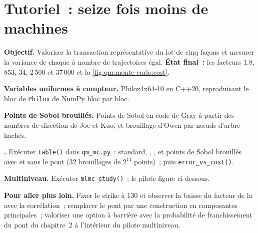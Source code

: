 \section{Tutoriel~: seize fois moins de machines}\label{tut:qm:monte-carlo:asian}

\begin{tutorial}
\textbf{Objectif.} Valoriser la transaction représentative du lot de cinq façons et mesurer la variance de chaque  à nombre de trajectoires égal. \textbf{État final~:} les facteurs 1.8, 853, 34, 2\,500 et 37\,000 et
la \cref{fig:qm:monte-carlo:cost}.
\begin{tutsteps}
\item \textbf{Variables uniformes à compteur.} Philox4x64-10 en C++20, reproduisant le bloc de \texttt{Philox} de NumPy bloc par bloc.
\label{lst:qm:monte-carlo:philox}
\item \textbf{Points de Sobol brouillés.} Points de Sobol en code de Gray à partir des nombres de direction de Joe et Kuo, et brouillage d'Owen par nœuds d'arbre hachés.
\label{lst:qm:monte-carlo:sobol}
\item \textbf{.} Exécuter \texttt{table()} dans \texttt{qm\_mc.py}~:  standard, , , et points de Sobol brouillés avec et sans le pont (32 brouillages de $2^{14}$ points)~; puis
\texttt{error\_vs\_cost()}.
\item \textbf{Multiniveau.} Exécuter \texttt{mlmc\_study()}~; le pilote figure ci-dessous.
\label{lst:qm:monte-carlo:mlmc}
\end{tutsteps}
\textbf{Pour aller plus loin.} Fixer le strike à 130 et observer la baisse du facteur de la  avec la corrélation~; remplacer le pont par une construction en composantes principales~; valoriser une option à barrière avec
la probabilité de franchissement du pont du chapitre~2 à l'intérieur du pilote multiniveau.
\end{tutorial}

